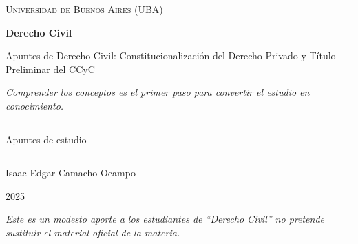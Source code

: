 \documentclass[12pt,oneside]{book}
\newcommand{\universidad}{Universidad de Buenos Aires (UBA)}
\newcommand{\materia}{Derecho Civil}
\newcommand{\titulo}{Apuntes de Derecho Civil: Constitucionalización del Derecho Privado y Título Preliminar del CCyC}
\newcommand{\autor}{Isaac Edgar Camacho Ocampo}
\newcommand{\anio}{2025}
\begin{document}
\begin{titlepage}

\thispagestyle{empty}

\begin{center}

\vspace*{1cm}

{\large \textsc{\universidad}}

\vspace{3cm}

{\Huge \textbf{\materia}}

\vspace{1cm}

{\LARGE \titulo}

\vspace{0.8cm}

\textit{Comprender los conceptos es el primer paso para convertir el estudio en conocimiento.}

\vspace{1.2cm}

\rule{0.70\textwidth}{0.5pt}

\vspace{0.5cm}

{\large Apuntes de estudio}

\vspace{0.5cm}

\rule{0.70\textwidth}{0.5pt}

\vfill

{\large \autor}

\vspace{0.3cm}

{\large \anio}

\end{center}

\vfill

\begin{flushleft}
\textit{Este es un modesto aporte a los estudiantes de ``Derecho Civil'' no pretende sustituir el material oficial de la materia.}
\end{flushleft}

\end{titlepage}

\tableofcontents

\end{document}
